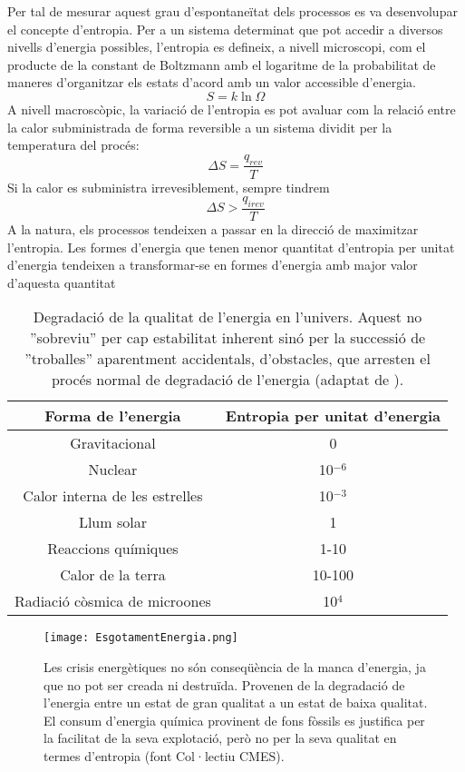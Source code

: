 Per tal de mesurar aquest grau d'espontaneïtat dels processos es va desenvolupar el concepte d'entropia. Per a un sistema determinat que pot accedir a diversos nivells d'energia possibles, l'entropia es defineix, a nivell microscopi, com el producte de la constant de Boltzmann amb el logaritme de la probabilitat de maneres d'organitzar els estats d'acord amb un valor accessible d'energia.
\[
S=k \ln \Omega
\]
A nivell macroscòpic, la variació de l'entropia es pot avaluar com la relació entre la calor subministrada de forma reversible a un sistema dividit per la temperatura del procés:
\[
\Delta S = \frac{q_{rev}}{T}
\]
Si la calor es subministra irrevesiblement, sempre tindrem 
\[
\Delta S > \frac{q_{irev}}{T}
\]
A la natura, els processos tendeixen a passar en la direcció de maximitzar l'entropia.
Les formes d'energia que tenen menor quantitat d'entropia per unitat d'energia tendeixen a transformar-se en formes d'energia amb major valor d'aquesta quantitat

\begin{table}[h!]
  \begin{center}
    \caption{Degradació de la qualitat de l'energia en l'univers. Aquest no ''sobreviu'' per cap estabilitat inherent sinó per la successió de ''troballes'' aparentment accidentals, d'obstacles, que arresten el procés normal de degradació de l'energia (adaptat de \citep{dyson_energy_1971}).}
    \label{tab:DegradacioEnergia}
       \begin{tabular}{cc}
Forma de l'energia & Entropia per unitat d'energia\\
\hline
Gravitacional & 0 \\
Nuclear & 10$^{-6}$ \\
Calor interna de les estrelles & 10$^{-3}$ \\
Llum solar & 1 \\
Reaccions químiques & 1-10 \\
Calor de la terra & 10-100 \\
Radiació còsmica de microones & 10$^4$ \\
\hline
       \end{tabular}
   \end{center}
\end{table}

\begin{figure}[h]
\centering
\texttt{[image: EsgotamentEnergia.png]}
\caption{Les crisis energètiques no són conseqüència de la manca d'energia, ja que no pot ser creada ni destruïda. Provenen de la degradació de l'energia entre un estat de gran qualitat a un estat de baixa qualitat. El consum d'energia química provinent de fons fòssils es justifica per la facilitat de la seva explotació, però no per la seva qualitat en termes d'entropia (font Col·lectiu CMES).}
\label{fig:EsgotamentEnergia}
\end{figure}

